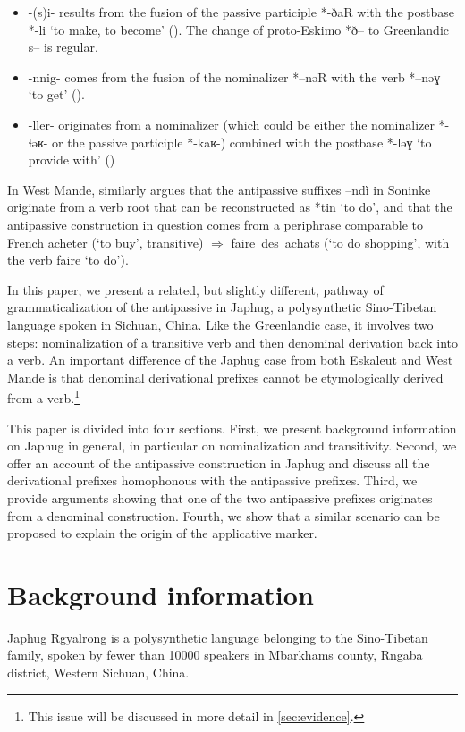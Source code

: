 \documentclass[oldfontcommands,oneside,a4paper,11pt]{article}
\newcommand{\ipa}[1]{{\phon \mbox{#1}}} %
\begin{document}
\begin{itemize}
\item  \ipa{-(s)i-} results from the fusion of the passive participle *\ipa{-ðaR} with the  postbase *\ipa{-li} `to make, to become' (\citealt[438, 447]{fortescue10dico}). The change of proto-Eskimo *\ipa{ð}-- to Greenlandic \ipa{s}-- is regular.
\item \ipa{-nnig-} comes from the fusion of the nominalizer *\ipa{--nəR} with the verb *\ipa{--nəɣ} `to get' (\citealt[457, 459]{fortescue10dico}).
\item  \ipa{-ller-} originates from a nominalizer (which could be either the nominalizer *\ipa{-ɬəʁ-} or the passive participle *\ipa{-kaʁ-}) combined with the postbase *\ipa{-ləɣ} `to provide with' (\citet[451, 442, 459]{fortescue10dico}) 
\end{itemize}

In West Mande, \citet{creissels12antip}  similarly argues that the antipassive suffixes \ipa{--ndì} in Soninke  originate from a verb root that can be reconstructed as *\ipa{tin} `to do', and that the antipassive construction in question comes from  a periphrase comparable to French \ipa{acheter} (`to buy', transitive) $\Rightarrow$ \ipa{faire des achats} (`to do shopping', with the verb \ipa{faire} `to do').
 	
 	
In this paper, we present a related, but slightly different, pathway of grammaticalization of the antipassive in Japhug, a polysynthetic Sino-Tibetan language spoken in Sichuan, China. Like the Greenlandic case, it involves two steps: nominalization of a transitive verb and then denominal derivation back into a verb. An important difference of the Japhug case from both Eskaleut and West Mande is that denominal derivational prefixes cannot be etymologically derived from a verb.\footnote{This issue will be discussed in more detail in \ref{sec:evidence}.}


This paper is divided into four sections. First, we present background information on Japhug in general, in particular on nominalization and transitivity. Second, we offer an account of the antipassive construction in Japhug and discuss all the derivational prefixes homophonous with the antipassive prefixes. Third, we provide arguments showing that one of the two antipassive prefixes originates from a denominal construction. Fourth, we show that a similar scenario can be proposed to explain the origin of the applicative marker.
 
 

\section{Background information}
Japhug Rgyalrong is a polysynthetic language belonging to the Sino-Tibetan family, spoken by fewer than 10000 speakers in Mbarkhams county, Rngaba district, Western Sichuan, China.
\end{document}
